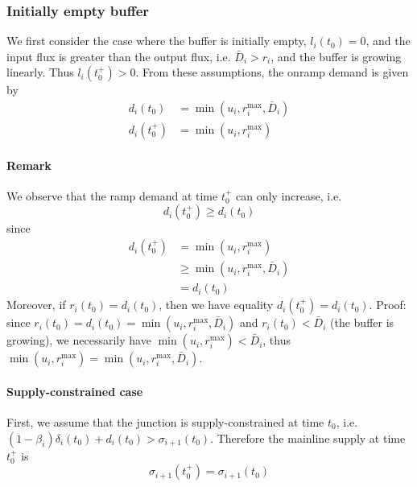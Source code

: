 \subsubsection{Initially empty buffer}
We first consider the case where the buffer is initially empty, $l_i(t_0) = 0$, and the input flux is greater than the output flux, i.e.  $\bar{D}_i > r_i$, and the buffer is growing linearly. Thus $l_i(t_0^+) > 0$. From these assumptions, the onramp demand is given by
\begin{align*}
d_i(t_0) &= \min (u_i, r_i^{\max}, \bar{D}_i) \\
d_i(t_0^+) &= \min (u_i, r_i^{\max})
\end{align*}

\paragraph{Remark} We observe that the ramp demand at time $t_0^+$ can only increase, i.e.
\begin{equation}
d_i(t_0^+) \geq d_i(t_0)
\label{eq:buffer-rampDemandIncrease}
\end{equation}
since
\begin{align*}
d_i(t_0^+)
&= \min (u_i, r_i^{\max})\\
&\geq \min (u_i, r_i^{\max}, \bar{D}_i) \\
& =d_i(t_0)
\end{align*}
Moreover, if $r_i(t_0) = d_i(t_0)$, then we have equality $d_i(t_0^+) = d_i(t_0)$. Proof: since $r_i(t_0) = d_i(t_0) = \min (u_i, r_i^{\max}, \bar{D}_i)$ and $r_i(t_0) < \bar{D}_i$ (the buffer is growing), we necessarily have $\min (u_i, r_i^{\max}) < \bar{D}_i$, thus $\min(u_i, r_i^{\max}) = \min (u_i, r_i^{\max}, \bar{D}_i)$.

\paragraph{Supply-constrained case}
First, we assume that the junction is supply-constrained at time $t_0$, i.e. $(1-\beta_i)\delta_i(t_0) + d_i(t_0) > \sigma_{i+1}(t_0)$. Therefore the mainline supply at time $t_0^+$ is
\begin{equation}
\sigma_{i+1}(t_0^+) = \sigma_{i+1}(t_0)
\label{eq:buffer-supplyIncrease}
\end{equation}

